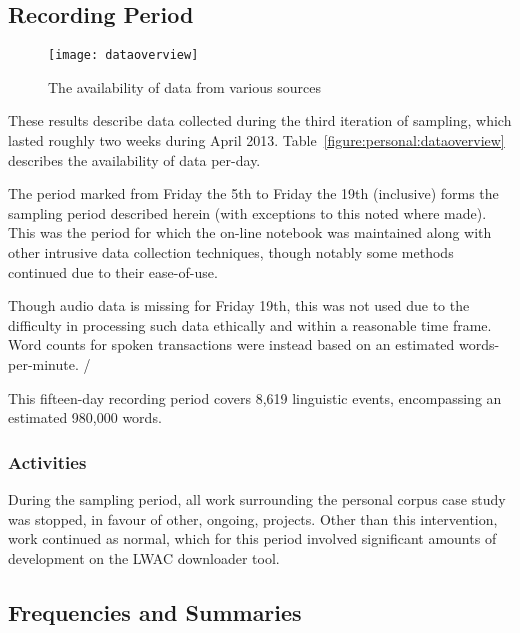 \subsection{Recording Period}

\begin{figure}[p]
\centering
\texttt{[image: dataoverview]}
\caption{The availability of data from various sources}
\label{fig:personal:dataoverview}
\end{figure}


These results describe data collected during the third iteration of sampling, which lasted roughly two weeks during April 2013.  Table~\ref{figure:personal:dataoverview} describes the availability of data per-day.

The period marked from Friday the 5th to Friday the 19th (inclusive) forms the sampling period described herein (with exceptions to this noted where made).  This was the period for which the on-line notebook was maintained along with other intrusive data collection techniques, though notably some methods continued due to their ease-of-use.

Though audio data is missing for Friday 19th, this was not used due to the difficulty in processing such data ethically and within a reasonable time frame.  Word counts for spoken transactions were instead based on an estimated words-per-minute.  /%

This fifteen-day recording period covers 8,619 linguistic events, encompassing an estimated 980,000 words.  



\subsubsection{Activities}
During the sampling period, all work surrounding the personal corpus case study was stopped, in favour of other, ongoing, projects.  Other than this intervention, work continued as normal, which for this period involved significant amounts of development on the LWAC downloader tool.






\subsection{Frequencies and Summaries}


